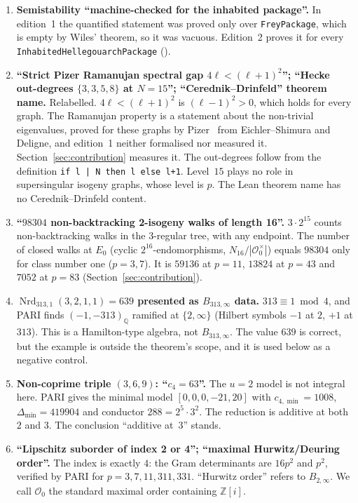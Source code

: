 \documentclass[11pt,a4paper]{article}
\theoremstyle{definition}
\newcommand{\Oz}{\mathcal{O}_0}
\newcommand{\Nrd}{\operatorname{Nrd}}
\newcommand{\lean}[1]{\path{#1}}
\begin{document}
\begin{enumerate}
  \item \textbf{Semistability ``machine-checked for the inhabited package''.} In edition~1 the quantified statement was proved only over \texttt{FreyPackage}, which is empty by Wiles' theorem, so it was vacuous. Edition~2 proves it for every \texttt{InhabitedHellegouarchPackage} (\lean{inhabited_hellegouarch_semistable}).
  \item \textbf{``Strict Pizer Ramanujan spectral gap $4\ell<(\ell+1)^2$''; ``Hecke out-degrees $\{3,3,5,8\}$ at $N=15$''; ``Cerednik--Drinfeld'' theorem name.} Relabelled. $4\ell<(\ell+1)^2$ is $(\ell-1)^2>0$, which holds for every graph. The Ramanujan property is a statement about the non-trivial eigenvalues, proved for these graphs by Pizer~\cite{Pizer1990} from Eichler--Shimura and Deligne, and edition~1 neither formalised nor measured it. Section~\ref{sec:contribution} measures it. The out-degrees follow from the definition \texttt{if l | N then l else l+1}. Level~$15$ plays no role in supersingular isogeny graphs, whose level is $p$. The Lean theorem name has no Cerednik--Drinfeld content.
  \item \textbf{``$98304$ non-backtracking 2-isogeny walks of length 16''.} $3\cdot2^{15}$ counts non-backtracking walks in the 3-regular tree, with any endpoint. The number of closed walks at $E_0$ (cyclic $2^{16}$-endomorphisms, $N_{16}/|\Oz^\times|$) equals $98304$ only for class number one ($p=3,7$). It is $59136$ at $p=11$, $13824$ at $p=43$ and $7052$ at $p=83$ (Section~\ref{sec:contribution}).
  \item \textbf{$\Nrd_{313,1}(3,2,1,1)=639$ presented as $B_{313,\infty}$ data.} $313\equiv1\bmod4$, and PARI finds $(-1,-313)_\mathbb Q$ ramified at $\{2,\infty\}$ (Hilbert symbols $-1$ at $2$, $+1$ at $313$). This is a Hamilton-type algebra, not $B_{313,\infty}$. The value $639$ is correct, but the example is outside the theorem's scope, and it is used below as a negative control.
  \item \textbf{Non-coprime triple $(3,6,9)$: ``$c_4=63$''.} The $u=2$ model is not integral here. PARI gives the minimal model $[0,0,0,-21,20]$ with $c_{4,\min}=1008$, $\Delta_{\min}=419904$ and conductor $288=2^5\cdot3^2$. The reduction is additive at both $2$ and $3$. The conclusion ``additive at~$3$'' stands.
  \item \textbf{``Lipschitz suborder of index 2 or 4''; ``maximal Hurwitz/Deuring order''.} The index is exactly $4$: the Gram determinants are $16p^2$ and $p^2$, verified by PARI for $p=3,7,11,311,331$. ``Hurwitz order'' refers to $B_{2,\infty}$. We call $\Oz$ the standard maximal order containing $\mathbb Z[i]$.

\end{enumerate}
\end{document}
